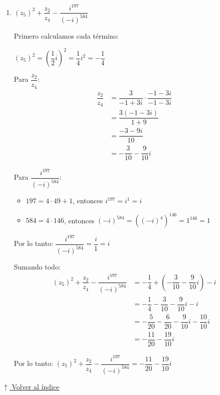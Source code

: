 \documentclass[12pt]{article}
\newcommand{\volverindice}{%
    \vspace{1em}%
    \begin{flushright}%
        \hyperlink{indice}{\small $\uparrow$ Volver al índice}%
    \end{flushright}%
}
\begin{document}
\begin{enumerate}[label=\alph*.-]
\begin{enumerate}[label=\roman*)]
        Por lo tanto: $\boxed{\dfrac{(z_3 - 2z_1)i^{98}}{z_1} = \dfrac{3-\sqrt{3}}{2} + \dfrac{1-\sqrt{3}}{2}i}$

        \item $(z_5)^2 + \dfrac{z_2}{z_4} - \dfrac{i^{197}}{(-i)^{584}}$
        
        Primero calculamos cada término:
        
        $(z_5)^2 = \left(\dfrac{1}{2}i\right)^2 = \dfrac{1}{4}i^2 = -\dfrac{1}{4}$
        
        Para $\dfrac{z_2}{z_4}$:
        \begin{align*}
        \dfrac{z_2}{z_4} &= \dfrac{3}{-1+3i} \cdot \dfrac{-1-3i}{-1-3i} \\[0.3em]
        &= \dfrac{3(-1-3i)}{1+9} \\[0.3em]
        &= \dfrac{-3-9i}{10} \\[0.3em]
        &= -\dfrac{3}{10} - \dfrac{9}{10}i
        \end{align*}
        
        Para $\dfrac{i^{197}}{(-i)^{584}}$:
        \begin{itemize}
            \item $197 = 4 \cdot 49 + 1$, entonces $i^{197} = i^1 = i$
            \item $584 = 4 \cdot 146$, entonces $(-i)^{584} = ((-i)^4)^{146} = 1^{146} = 1$
        \end{itemize}
        
        Por lo tanto: $\dfrac{i^{197}}{(-i)^{584}} = \dfrac{i}{1} = i$
        
        Sumando todo:
        \begin{align*}
        (z_5)^2 + \dfrac{z_2}{z_4} - \dfrac{i^{197}}{(-i)^{584}} &= -\dfrac{1}{4} + \left(-\dfrac{3}{10} - \dfrac{9}{10}i\right) - i \\[0.3em]
        &= -\dfrac{1}{4} - \dfrac{3}{10} - \dfrac{9}{10}i - i \\[0.3em]
        &= -\dfrac{5}{20} - \dfrac{6}{20} - \dfrac{9}{10}i - \dfrac{10}{10}i \\[0.3em]
        &= -\dfrac{11}{20} - \dfrac{19}{10}i
        \end{align*}
        
        Por lo tanto: $\boxed{(z_5)^2 + \dfrac{z_2}{z_4} - \dfrac{i^{197}}{(-i)^{584}} = -\dfrac{11}{20} - \dfrac{19}{10}i}$
    \end{enumerate}
\end{enumerate}

\volverindice
\newpage
\end{document}
